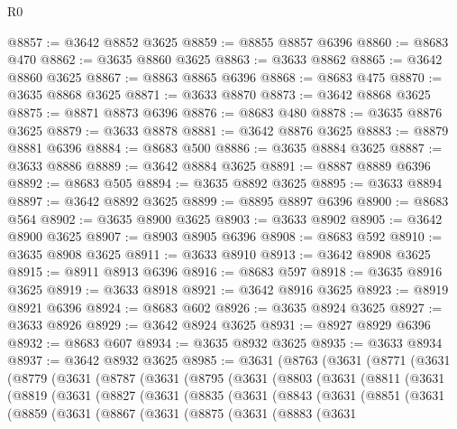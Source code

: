 \begin{lexlean}{R0}
\begin{coremodule}
@8857 := @3642 @8852 @3625
@8859 := @8855 @8857 @6396
@8860 := @8683 @470
@8862 := @3635 @8860 @3625
@8863 := @3633 @8862
@8865 := @3642 @8860 @3625
@8867 := @8863 @8865 @6396
@8868 := @8683 @475
@8870 := @3635 @8868 @3625
@8871 := @3633 @8870
@8873 := @3642 @8868 @3625
@8875 := @8871 @8873 @6396
@8876 := @8683 @480
@8878 := @3635 @8876 @3625
@8879 := @3633 @8878
@8881 := @3642 @8876 @3625
@8883 := @8879 @8881 @6396
@8884 := @8683 @500
@8886 := @3635 @8884 @3625
@8887 := @3633 @8886
@8889 := @3642 @8884 @3625
@8891 := @8887 @8889 @6396
@8892 := @8683 @505
@8894 := @3635 @8892 @3625
@8895 := @3633 @8894
@8897 := @3642 @8892 @3625
@8899 := @8895 @8897 @6396
@8900 := @8683 @564
@8902 := @3635 @8900 @3625
@8903 := @3633 @8902
@8905 := @3642 @8900 @3625
@8907 := @8903 @8905 @6396
@8908 := @8683 @592
@8910 := @3635 @8908 @3625
@8911 := @3633 @8910
@8913 := @3642 @8908 @3625
@8915 := @8911 @8913 @6396
@8916 := @8683 @597
@8918 := @3635 @8916 @3625
@8919 := @3633 @8918
@8921 := @3642 @8916 @3625
@8923 := @8919 @8921 @6396
@8924 := @8683 @602
@8926 := @3635 @8924 @3625
@8927 := @3633 @8926
@8929 := @3642 @8924 @3625
@8931 := @8927 @8929 @6396
@8932 := @8683 @607
@8934 := @3635 @8932 @3625
@8935 := @3633 @8934
@8937 := @3642 @8932 @3625
@8985 := @3631
    (@8763
      (@3631
        (@8771
          (@3631
            (@8779
              (@3631
                (@8787
                  (@3631
                    (@8795
                      (@3631
                        (@8803
                          (@3631
                            (@8811
                              (@3631
                                (@8819
                                  (@3631
                                    (@8827
                                      (@3631
                                        (@8835
                                          (@3631
                                            (@8843
                                              (@3631
                                                (@8851
                                                  (@3631
                                                    (@8859
                                                      (@3631
                                                        (@8867
                                                          (@3631
                                                            (@8875
                                                              (@3631
                                                                (@8883
                                                                  (@3631

\end{coremodule}
\end{lexlean}
